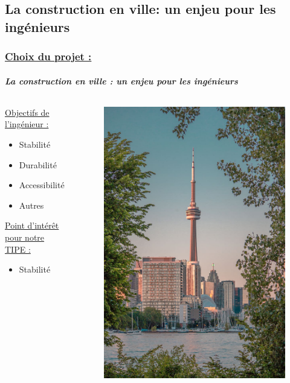 \documentclass[10pt]{beamer}
\begin{document}
	\subsection{La construction en ville: un enjeu pour les ing\'enieurs}
	\begin{frame}
		\frametitle{\uline{Choix du projet :}}
		\framesubtitle{\textit{La construction en ville : un enjeu pour les ing\'enieurs}}
		\begin{columns}[t]
  			\begin{column}{5cm} 
				\begin{block}{}
					\uline{Objectifs de l'ing\'enieur :}
  					\begin{itemize}
						\item Stabilit\'e
						\item Durabilit\'e
						\item Accessibilit\'e
						\item Autres
					\end{itemize}
					\uline{Point d'int\'er\^et pour notre TIPE :}
					\begin{itemize}
						\item Stabilit\'e
					\end{itemize}
				\end{block}
  			\end{column}
 			\begin{column}{5cm}
 				\begin{figure}
   					\includegraphics[scale = 0.125]{Images/city.png}

\end{figure}
\end{column}
\end{columns}
\end{frame}
\end{document}
